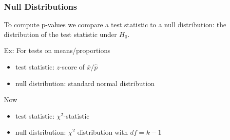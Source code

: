 \documentclass[handout]{beamer}
\newcommand{\blue}[1]{\textcolor{blue2}{#1}}
\newcommand{\xbar}{\overline{x}}
\begin{document}
\begin{frame}[fragile]
\frametitle{Null Distributions}
To compute p-values we compare a \blue{test statistic} to a \blue{null distribution}:  the distribution of the test statistic under $H_0$.

\vspace{0.5cm}

\pause Ex: For tests on means/proportions

\begin{itemize}
\item test statistic: $z$-score of $\xbar / \widehat{p}$
\item null distribution: standard normal distribution
\end{itemize}

\pause Now

\begin{itemize}
\item test statistic: $\chi^2$-statistic
\item null distribution: $\chi^2$ distribution with $df=k-1$
\end{itemize}


\end{frame}
\end{document}
